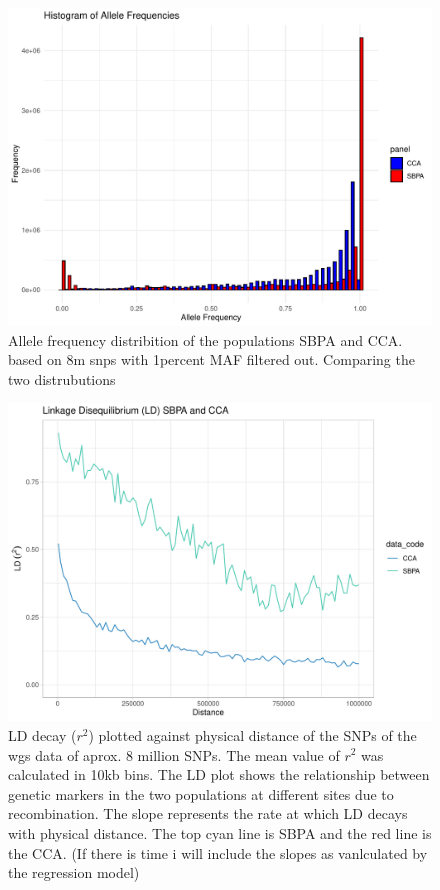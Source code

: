 \documentclass[9pt, twocolumn,twoside]{gsajnl}
\begin{document}
\begin{figure}[p]
\centering
\includegraphics[width=\linewidth]{plot_AF.wgs.pdf}

\caption{Allele frequency distribition of the populations SBPA and CCA.  based on 8m snps with 1percent MAF filtered out. Comparing the two distrubutions }
\label{fig:AF}
\end{figure}
\begin{figure}[p]
\centering
\includegraphics[width=\linewidth]{plot_LD_light.pdf}

\caption{LD decay ($r^2$) plotted against physical distance of the SNPs of the wgs data of aprox. 8 million SNPs. The mean value of $r^2$ was calculated in 10kb bins. The LD plot shows the relationship between genetic markers in the two populations at different sites due to recombination. The slope represents the rate at which LD decays with physical distance. The top cyan line is SBPA and the red line is the CCA. (If there is time i will include the slopes as vanlculated by the regression model)}

\label{fig:LD}
\end{figure}
\end{document}
